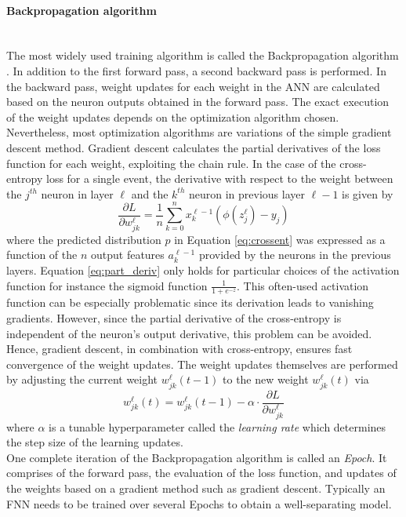 \paragraph{Backpropagation algorithm} \mbox{} \\
The most widely used training algorithm is called the Backpropagation algorithm \cite{backpro}. In addition to the first forward pass, a second backward pass is performed. In the backward pass, weight updates for each weight in the ANN are calculated based on the neuron outputs obtained in the forward pass. The exact execution of the weight updates depends on the optimization algorithm chosen. Nevertheless, most optimization algorithms are variations of the simple gradient descent method. Gradient descent calculates the partial derivatives of the loss function for each weight, exploiting the chain rule. In the case of the cross-entropy loss for a single event, the derivative with respect to the weight between the $j^{th}$ neuron in layer $\ell$ and the $k^{th}$ neuron in previous layer $\ell-1$ is given by
\begin{equation}
\label{eq:part_deriv}
\frac{\partial L}{\partial w^{\ell}_{jk}} =  \frac{1}{n} \sum_{k=0}^n x^{\ell-1}_{k} (\phi(z^{\ell}_{j})-y_{j}) 
\end{equation} 
where the predicted distribution $p$ in Equation \ref{eq:crossent} was expressed as a function of the $n$ output features $a^{\ell-1}_{k}$ provided by the neurons in the previous layers. Equation \ref{eq:part_deriv} only holds for particular choices of the activation function for instance the sigmoid function $\frac{1}{1+e^{-z}}$. This often-used activation function can be especially problematic since its derivation leads to vanishing gradients. However, since the partial derivative of the cross-entropy is independent of the neuron's output derivative, this problem can be avoided. Hence, gradient descent, in combination with cross-entropy, ensures fast convergence of the weight updates. The weight updates themselves are performed by adjusting the current weight 
$w^{\ell}_{jk}(t-1)$ to the new weight $w^{\ell}_{jk}(t)$ via
\begin{equation}
\label{eq:WeightUpdate}
w^{\ell}_{jk}(t) = w^{\ell}_{jk}(t-1) - \alpha \cdot \frac{\partial L}{\partial w^{\ell}_{jk}}
\end{equation}
where $\alpha$ is a tunable hyperparameter called the \textit{learning rate} which determines the step size of the learning updates. \\
One complete iteration of the Backpropagation algorithm is called an \textit{Epoch}. It comprises of the forward pass, the evaluation of the loss function, and updates of the weights based on a gradient method such as gradient descent. Typically an FNN needs to be trained over several Epochs to obtain a well-separating model.

